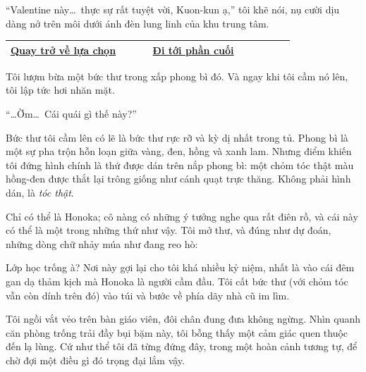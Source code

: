 \documentclass[../main.tex]{subfiles}
\begin{document}
``Valentine này\dots\ thực sự rất tuyệt vời, Kuon-kun ạ,'' tôi khẽ nói, nụ cười dịu dàng nở trên môi dưới ánh đèn lung linh của khu trung tâm.

\begin{table}[H]
  \centering
  \setlength{\arrayrulewidth}{1pt}
  \begin{tabular}{|>{\centering\arraybackslash}p{0.4\linewidth}|>{\centering\arraybackslash}p{0.4\linewidth}|}
    \hline
    \hyperref[choice]{Quay trở về lựa chọn} & \hyperref[ending]{Đi tới phần cuối} \\ \hline
  \end{tabular}
\end{table}

\newpage
\label{honoka}

Tôi lượm bừa một bức thư trong xấp phong bì đó. Và ngay khi tôi cầm nó lên, tôi lập tức hơi nhăn mặt.

``\dots Ờm\dots\ Cái quái gì thế này?''

Bức thư tôi cầm lên có lẽ là bức thư rực rỡ và kỳ dị nhất trong tủ. Phong bì là một sự pha trộn hỗn loạn giữa vàng, đen, hồng và xanh lam. Nhưng điểm khiến tôi đứng hình chính là thứ được dán trên nắp phong bì: một chỏm tóc thật màu hồng-đen được thắt lại trông giống như cánh quạt trực thăng. Không phải hình dán, là \emph{tóc thật}.

Chỉ có thể là Honoka; cô nàng có những ý tưởng nghe qua rất điên rồ, và cái này có thể là một trong những thứ như vậy. Tôi mở thư, và đúng như dự đoán, những dòng chữ nhảy múa như đang reo hò:


Lớp học trống à? Nơi này gợi lại cho tôi khá nhiều kỷ niệm, nhất là vào cái đêm gan dạ thảm kịch mà Honoka là người cầm đầu. Tôi cất bức thư (với chỏm tóc vẫn còn dính trên đó) vào túi và bước về phía dãy nhà cũ im lìm.

\ct


Tôi ngồi vắt vẻo trên bàn giáo viên, đôi chân đung đưa không ngừng. Nhìn quanh căn phòng trống trải đầy bụi bặm này, tôi bỗng thấy một cảm giác quen thuộc đến lạ lùng. Cứ như thể tôi đã từng đứng đây, trong một hoàn cảnh tương tự, để chờ đợi một điều gì đó trọng đại lắm vậy.
\end{document}
